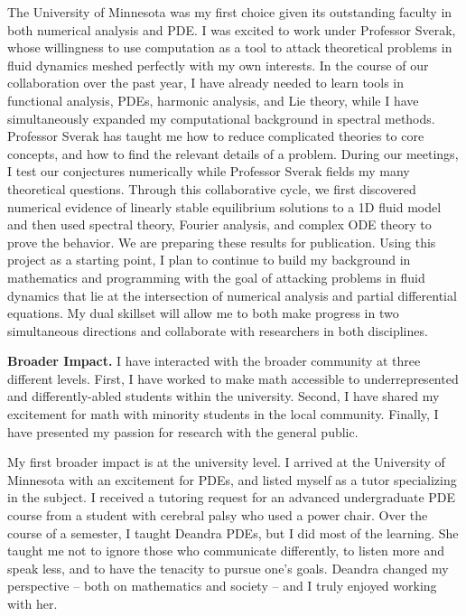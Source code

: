 \documentclass[12pt]{article}
\begin{document}
The University of Minnesota was my first choice given its outstanding faculty in both numerical analysis and PDE. I was excited to work under Professor Sverak, whose willingness to use computation as a tool to attack theoretical problems in fluid dynamics meshed perfectly with my own interests. In the course of our collaboration over the past year, I have already needed to learn tools in functional analysis, PDEs, harmonic analysis, and Lie theory, while I have simultaneously expanded my computational background in spectral methods. Professor Sverak has taught me how to reduce complicated theories to core concepts, and how to find the relevant details of a problem. During our meetings, I test our conjectures numerically while Professor Sverak fields my many theoretical questions. Through this collaborative cycle, we first discovered numerical evidence of linearly stable equilibrium solutions to a 1D fluid model and then used spectral theory, Fourier analysis, and complex ODE theory to prove the behavior. We are preparing these results for publication. Using this project as a starting point, I plan to continue to build my background in mathematics and programming with the goal of attacking problems in fluid dynamics that lie at the intersection of numerical analysis and partial differential equations. My dual skillset will allow me to both make progress in two simultaneous directions and collaborate with researchers in both disciplines.

\textbf{Broader Impact.} I have interacted with the broader community at three different levels. First, I have worked to make math accessible to underrepresented and differently-abled students within the university. Second, I have shared my excitement for math with minority students in the local community. Finally, I have presented my passion for research with the general public.

My first broader impact is at the university level. I arrived at the University of Minnesota with an excitement for PDEs, and listed myself as a tutor specializing in the subject. I received a tutoring request for an advanced undergraduate PDE course from a student with cerebral palsy who used a power chair. Over the course of a semester, I taught Deandra PDEs, but I did most of the learning.  She taught me not to ignore those who communicate differently, to listen more and speak less, and to have the tenacity to pursue one's goals. Deandra changed my perspective -- both on mathematics and society -- and I truly enjoyed working with her.
\end{document}
